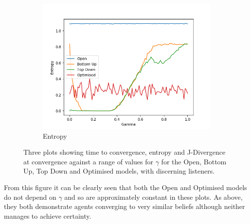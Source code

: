 \begin{figure}[H]
\begin{subfigure}[ht]{0.45\textwidth}
    \includegraphics[width=\textwidth]{Images/Figures/ListenerModelPlots/FIE/Entropy.png}
    \caption{Entropy}
 \end{subfigure}

 \caption{Three plots showing time to convergence, entropy and J-Divergence at convergence against a range of values for $\gamma$ for the Open, Bottom Up, Top Down and Optimised models, with discerning listeners.} \label{fig:convergence_FIE}
\end{figure}


From this figure it can be clearly seen that both the Open and Optimised models do not depend on $\gamma$ and so are approximately constant in these plots. As above, they both demonstrate agents converging to very similar beliefs although neither manages to achieve certainty. 

